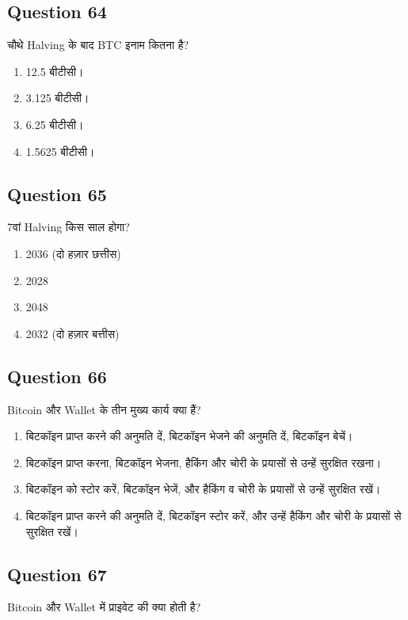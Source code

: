 \documentclass[12pt,a4paper]{article}
\begin{document}
\bigskip


\subsection*{Question 64}
चौथे Halving के बाद BTC इनाम कितना है?

\begin{enumerate}[label=\Alph*., leftmargin=*]
\item 12.5 बीटीसी।
\item 3.125 बीटीसी।
\item 6.25 बीटीसी।
\item 1.5625 बीटीसी।
\end{enumerate}

\bigskip


\subsection*{Question 65}
7वां Halving किस साल होगा?

\begin{enumerate}[label=\Alph*., leftmargin=*]
\item 2036 (दो हज़ार छत्तीस)
\item 2028
\item 2048
\item 2032 (दो हज़ार बत्तीस)
\end{enumerate}

\bigskip


\subsection*{Question 66}
Bitcoin और Wallet के तीन मुख्य कार्य क्या हैं?

\begin{enumerate}[label=\Alph*., leftmargin=*]
\item बिटकॉइन प्राप्त करने की अनुमति दें, बिटकॉइन भेजने की अनुमति दें, बिटकॉइन बेचें।
\item बिटकॉइन प्राप्त करना, बिटकॉइन भेजना, हैकिंग और चोरी के प्रयासों से उन्हें सुरक्षित रखना।
\item बिटकॉइन को स्टोर करें, बिटकॉइन भेजें, और हैकिंग व चोरी के प्रयासों से उन्हें सुरक्षित रखें।
\item बिटकॉइन प्राप्त करने की अनुमति दें, बिटकॉइन स्टोर करें, और उन्हें हैकिंग और चोरी के प्रयासों से सुरक्षित रखें।
\end{enumerate}

\bigskip


\subsection*{Question 67}
Bitcoin और Wallet में प्राइवेट की क्या होती है?
\end{document}
